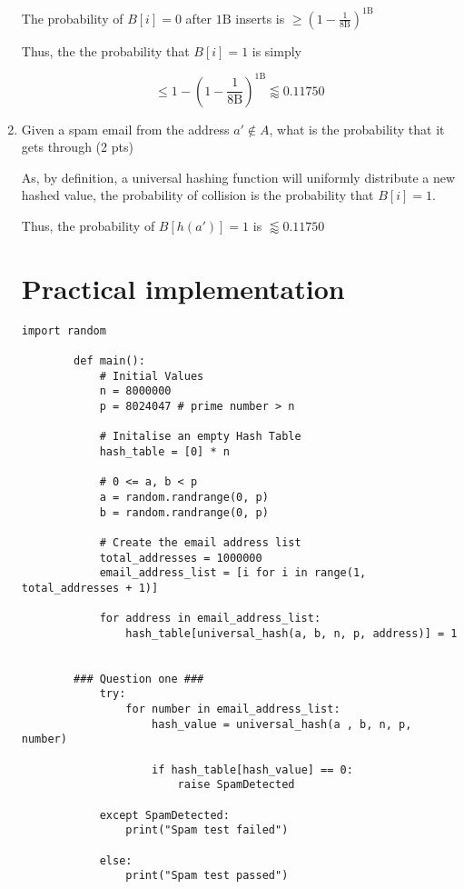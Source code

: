 \documentclass[12pt,letterpaper]{article}
\begin{document}
\begin{enumerate}
		The probability of $B[i] = 0$ after $1\text{B}$ inserts is $\geq (1 - \frac{1}{8\text{B}})^{1\text{B}}$		
		
		Thus, the the probability that $B[i] = 1$ is simply
		
		$$\leq 1 - (1 - \frac{1}{8\text{B}})^{1\text{B}} \lessapprox 0.11750 $$
		
		\item 
		Given a spam email from the address $a' \notin A$, what is the probability that it gets through (2 pts)
		
		As, by definition, a universal hashing function will uniformly distribute a new hashed value, the probability of collision is the probability that $B[i] = 1$.
		
		Thus, the probability of $B[h(a')] = 1$ is $\lessapprox 0.11750$
		
		\pagebreak
		
		\section*{Practical implementation}
		
		\begin{lstlisting}[style = Python]	
	import random

        def main(): 
            # Initial Values
            n = 8000000
            p = 8024047 # prime number > n

            # Initalise an empty Hash Table
            hash_table = [0] * n

            # 0 <= a, b < p
            a = random.randrange(0, p)
            b = random.randrange(0, p)
            
            # Create the email address list
            total_addresses = 1000000
            email_address_list = [i for i in range(1, total_addresses + 1)]
            
            for address in email_address_list:
                hash_table[universal_hash(a, b, n, p, address)] = 1 


        ### Question one ###
            try:
                for number in email_address_list:
                    hash_value = universal_hash(a , b, n, p, number)
                    
                    if hash_table[hash_value] == 0:
                        raise SpamDetected

            except SpamDetected:
                print("Spam test failed")

            else:
                print("Spam test passed")


\end{lstlisting}
\end{enumerate}
\end{document}
